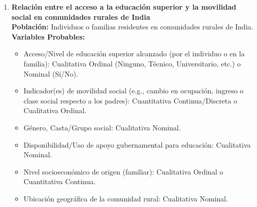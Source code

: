 \documentclass[12pt, letterpaper]{article}
\begin{document}
\begin{enumerate}
\item \textbf{Relación entre el acceso a la educación superior y la movilidad social en comunidades rurales de India} \\
\textbf{Población:} Individuos o familias residentes en comunidades rurales de India. \\
\textbf{Variables Probables:}
\begin{itemize}
    \item Acceso/Nivel de educación superior alcanzado (por el individuo o en la familia): Cualitativa Ordinal (Ninguno, Técnico, Universitario, etc.) o Nominal (Sí/No).
    \item Indicador(es) de movilidad social (e.g., cambio en ocupación, ingreso o clase social respecto a los padres): Cuantitativa Continua/Discreta o Cualitativa Ordinal.
    \item Género, Casta/Grupo social: Cualitativa Nominal.
    \item Disponibilidad/Uso de apoyo gubernamental para educación: Cualitativa Nominal.
    \item Nivel socioeconómico de origen (familiar): Cualitativa Ordinal o Cuantitativa Continua.
    \item Ubicación geográfica de la comunidad rural: Cualitativa Nominal.
\end{itemize}

\end{enumerate}
\end{document}
